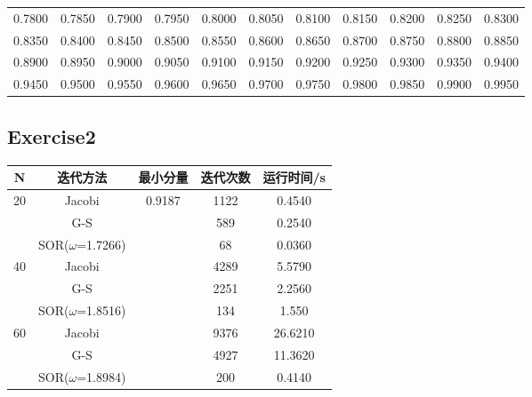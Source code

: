 \documentclass{article}
\begin{document}
\begin{table}[H]
\begin{tabular}{|*{11}{c}|}
		0.7800 & 0.7850 & 0.7900 & 0.7950 & 0.8000 & 0.8050 & 0.8100 & 0.8150 & 0.8200 & 0.8250 & 0.8300 \\
		0.8350 & 0.8400 & 0.8450 & 0.8500 & 0.8550 & 0.8600 & 0.8650 & 0.8700 & 0.8750 & 0.8800 & 0.8850 \\
		0.8900 & 0.8950 & 0.9000 & 0.9050 & 0.9100 & 0.9150 & 0.9200 & 0.9250 & 0.9300 & 0.9350 & 0.9400 \\
		0.9450 & 0.9500 & 0.9550 & 0.9600 & 0.9650 & 0.9700 & 0.9750 & 0.9800 & 0.9850 & 0.9900 & 0.9950 \\
		\hline
	\end{tabular}
\end{table}

\subsection*{Exercise2}

\begin{table}[H]
	\centering
	\begin{tabular}{|c|c|c|c|c|}
		\hline
		\textbf{N}          & \textbf{迭代方法}     & \textbf{最小分量} & \textbf{迭代次数}           & \textbf{运行时间/s} \\ \hline
		\multirow{3}{*}{20} & Jacobi            & \multirow{9}{*}{0.9187} & 1122 & 0.4540       \\ \cline{2-2} \cline{4-5} 
		& G-S               &                         & 589 & 0.2540        \\ \cline{2-2} \cline{4-5} 
		& SOR($\omega$=1.7266) &                         & 68  & 0.0360        \\ \cline{1-2} \cline{4-5} 
		\multirow{3}{*}{40} & Jacobi            &                         & 4289 & 5.5790        \\ \cline{2-2} \cline{4-5} 
		& G-S               &                         & 2251 & 2.2560        \\ \cline{2-2} \cline{4-5} 
		& SOR($\omega$=1.8516) &                         & 134  & 1.550         \\ \cline{1-2} \cline{4-5} 
		\multirow{3}{*}{60} & Jacobi            &                         & 9376 & 26.6210       \\ \cline{2-2} \cline{4-5} 
		& G-S               &                         & 4927 & 11.3620       \\ \cline{2-2} \cline{4-5} 
		& SOR($\omega$=1.8984) &                         & 200  & 0.4140        \\ \hline
	\end{tabular}
\end{table}
\end{document}
